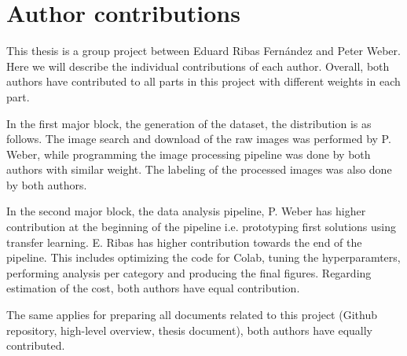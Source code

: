 
\chapter{Author contributions} %

\label{AuthorContributions}

This thesis is a group project between Eduard Ribas Fernández and Peter Weber. Here we will describe the individual contributions of each author. Overall, both authors have contributed to all parts in this project with different weights in each part.

In the first major block, the generation of the dataset, the distribution is as follows. The image search and download of the raw images was performed by P. Weber, while programming the image processing pipeline was done by both authors with similar weight. The labeling of the processed images was also done by both authors.

In the second major block, the data analysis pipeline, P. Weber has higher contribution at the beginning of the pipeline i.e. prototyping first solutions using transfer learning. E. Ribas has higher contribution towards the end of the pipeline. This includes optimizing the code for Colab, tuning the hyperparamters, performing analysis per category and producing the final figures.
Regarding estimation of the cost, both authors have equal contribution.

The same applies for preparing all documents related to this project (Github repository, high-level overview, thesis document), both authors have equally contributed.
